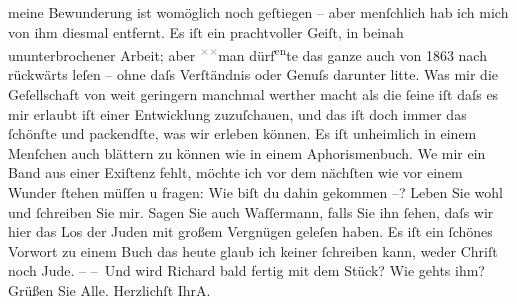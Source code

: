 \begin{ledgroupsized}[t]{13cm}
               meine Bewunderung ist womöglich noch geſtiegen – aber menſchlich hab ich mich von ihm
               diesmal entfernt. Es iſt ein prachtvoller Geiſt, in beinah ununterbrochener Arbeit;
               aber \substVorne{}\textsuperscript{\textcolor{gray}{×}\-\textcolor{gray}{×}}\substDazwischen{}man\substHinten{} dürf\substVorne{}\textsuperscript{en}\substDazwischen{}te\substHinten{} das ganze auch von 1863 nach rückwärts leſen – ohne daſs
               Verſtändnis {\pb}oder Genuſs darunter litte. Was mir die
               Geſellschaft von weit geringern \introOben{}manchmal\introOben{} werther macht als
               die ſeine iſt daſs es mir erlaubt iſt einer Entwicklung zuzuſchauen, und das iſt doch
               immer das ſchönſte und packendſte, was wir erleben können. Es iſt unheimlich in einem
               Menſchen auch blättern zu können wie in einem Aphorismenbuch. We{\geminationn} mir ein Band aus einer Exiſtenz fehlt, möchte ich vor
                  {\pb}dem nächſten wie vor einem Wunder ſtehen müſſen u
               fragen: Wie biſt du dahin gekommen –?\pend
           \pstart
           Leben Sie wohl und ſchreiben Sie mir.\pend
           \pstart
           Sagen Sie auch Waſſermann, falls Sie ihn ſehen,
               daſs wir hier das Los der Juden mit großem
               Vergnügen geleſen haben. Es iſt ein ſchönes Vorwort zu einem Buch das heute glaub ich
               keiner ſchreiben kann, weder Chriſt noch Jude. –\pend
           \pstart
           – Und wird Richard bald {\pb}fertig mit dem Stück? Wie gehts ihm?\pend
           \pstart
            Grüßen Sie Alle.\pend
           \pstart Herzlichſt Ihr\spacefill\mbox{A.}\pend{}\endnumbering{}\end{ledgroupsized}  \newcommand{\dateiname}{L01424}\newcommand{\titel}{Arthur Schnitzler an Hugo von Hofmannsthal, 9. 8. 1904}\newcommand{\editorInnen}{ Martin Anton Müller und Gerd-Hermann Susen}
      